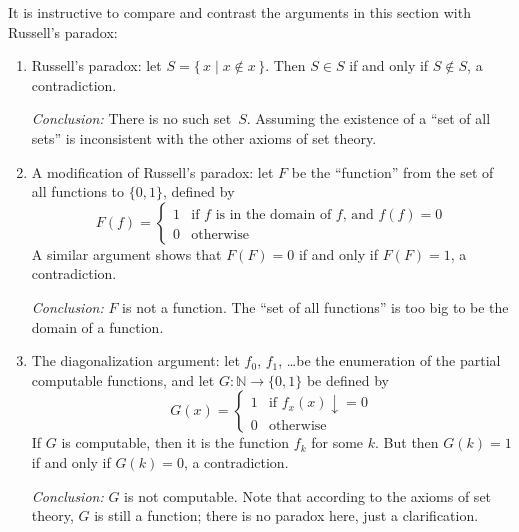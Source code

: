 \documentclass[10pt,a4paper]{article}
\theoremstyle{plain}
\theoremstyle{definition}
\theoremstyle{remark}
\providecommand{\Nat}{\ensuremath{\mathbb{N}}}
\providecommand{\Setabs}[2]{\{\, #1 \mid #2 \,\}}
\begin{document}
It is instructive to compare and contrast the arguments in
this section with Russell's paradox:
\begin{enumerate}
\item Russell's paradox: let $S = \Setabs{x}{x \notin x}$. Then $S
  \in S$ if and only if $S \notin S$, a contradiction.

  \emph{Conclusion:} There is no such set~$S$. Assuming the existence of a
  ``set of all sets'' is inconsistent with the other axioms of set
  theory.

\item A modification of Russell's paradox: let $F$ be the ``function''
  from the set of all functions to $\{ 0, 1 \}$, defined by
  \[
  F(f) =
  \begin{cases}
    1 & \text{if $f$ is in the domain of $f$, and $f(f) = 0$} \\
    0 & \text{otherwise}
  \end{cases}
  \]
  A similar argument shows that $F(F) = 0$ if and only if $F(F) = 1$,
  a contradiction.

  \emph{Conclusion:} $F$ is not a function. The ``set of all
  functions'' is too big to be the domain of a function.

\item The diagonalization argument: let $f_0$, $f_1$, \dots be the
  enumeration of the partial computable functions, and let $G \colon \Nat \to
  \{ 0, 1 \}$ be defined by
  \[
  G(x) =
  \begin{cases}
    1 & \text{if $f_x(x)\downarrow = 0$} \\
    0 & \text{otherwise}
  \end{cases}
  \]
  If $G$ is computable, then it is the function $f_k$ for some
  $k$. But then $G(k) = 1$ if and only if $G(k) = 0$, a contradiction.

  \emph{Conclusion:} $G$ is not computable. Note that according to the
  axioms of set theory, $G$ is still a function; there is no paradox
  here, just a clarification.
\end{enumerate}
\end{document}
